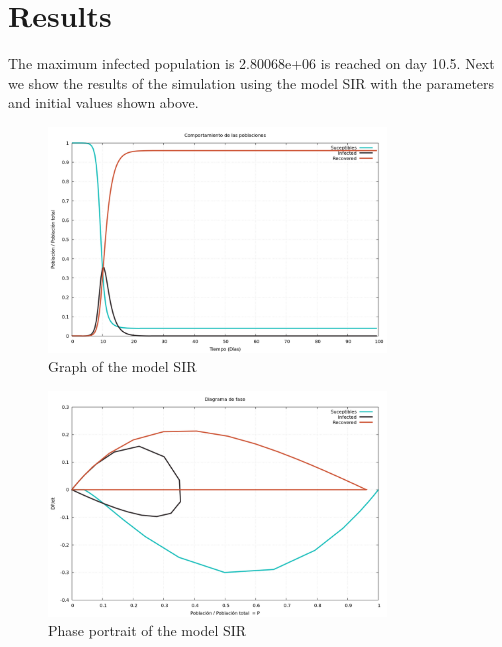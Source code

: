 \documentclass{article}
\begin{document}
\section*{Results}
The maximum infected population is 2.80068e+06 is reached on day 10.5.
Next we show the results of the simulation using the model SIR with the parameters and initial values shown above.
\begin{figure}[H]
\centering
\includegraphics[width=0.8\textwidth]{./data/Proyecto4/graph-SIR.png}
\caption{Graph of the model SIR}
\end{figure}
\begin{figure}[H]
\centering
\includegraphics[width=0.8\textwidth]{./data/Proyecto4/phase-SIR.png}
\caption{Phase portrait of the model SIR}
\end{figure}
\end{document}
